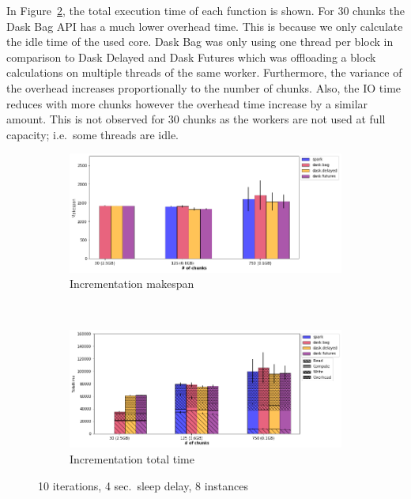 \documentclass[conference]{IEEEtran}
\begin{document}
In Figure~\ref{fig:inc_tt_chunk}, the total execution time of each function is shown.
For 30 chunks the Dask Bag API has a much lower overhead time. This is because we
only calculate the idle time of the used core. Dask Bag was only using one thread per
block in comparison to Dask Delayed and Dask Futures which was offloading a block
calculations on multiple threads of the same worker. Furthermore, the variance of the
overhead increases proportionally to the number of chunks. Also, the IO time reduces
with more chunks however the overhead time increase by a similar amount. This is not
observed for 30 chunks as the workers are not used at full capacity; i.e.\ some
threads are idle.

\begin{figure}[!t]
    \centering
    \begin{subfigure}[b]{\columnwidth}
        \includegraphics[clip,width=\columnwidth]{images/inc_chunk.png}%
        \caption{Incrementation makespan}\label{fig:inc_ms_chunk}
    \end{subfigure}
    \\
    \begin{subfigure}[b]{\columnwidth}
        \includegraphics[clip,width=\columnwidth]{images/inc_idle_chunk.png}%
        \caption{Incrementation total time}\label{fig:inc_tt_chunk}
    \end{subfigure}
    \caption{10 iterations, 4 sec.\ sleep delay, 8 instances}\label{fig:inc_chunk}
\end{figure}
\end{document}
